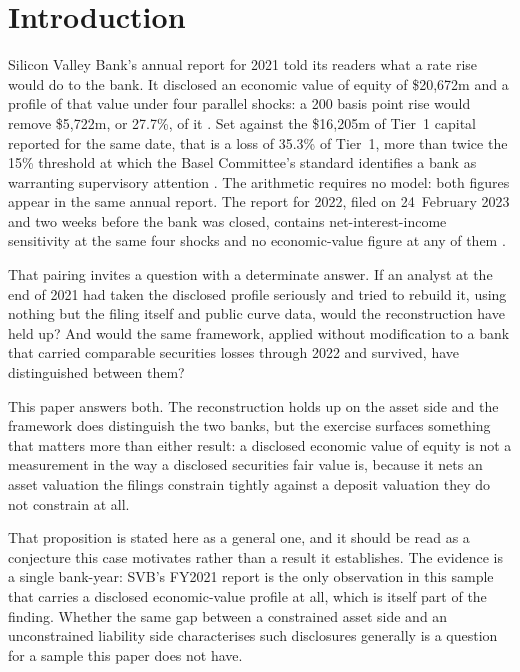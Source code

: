 \section{Introduction}
\label{sec:introduction}

Silicon Valley Bank's annual report for 2021 told its readers what a rate rise would
do to the bank. It disclosed an economic value of equity of \$20,672m and a profile
of that value under four parallel shocks: a 200 basis point rise would remove
\$5,722m, or 27.7\%, of it \citep{SVB10K2021}. Set against the \$16,205m of Tier~1
capital reported for the same date, that is a loss of 35.3\% of Tier~1, more than
twice the 15\% threshold at which the Basel Committee's standard identifies a bank as
warranting supervisory attention \citep{BCBS2016}. The arithmetic requires no model:
both figures appear in the same annual report. The report for 2022, filed on
24~February 2023 and two weeks before
the bank was closed, contains net-interest-income sensitivity at the same four shocks
and no economic-value figure at any of them \citep{SVB10K2022}.

That pairing invites a question with a determinate answer. If an analyst at the end of
2021 had taken the disclosed profile seriously and tried to rebuild it, using
nothing but the filing itself and public curve data, would the reconstruction have
held up? And would the same framework, applied without modification to a bank that
carried comparable securities losses through 2022 and survived, have distinguished
between them?

This paper answers both. The reconstruction holds up on the asset side and the
framework does distinguish the two banks, but the exercise surfaces something that
matters more than either result: a disclosed economic value of equity is not a
measurement in the way a disclosed securities fair value is, because it nets an asset
valuation the filings constrain tightly against a deposit valuation they do not
constrain at all.

That proposition is stated here as a general one, and it should be read as a
conjecture this case motivates rather than a result it establishes. The evidence is a
single bank-year: SVB's FY2021 report is the only observation in this sample that
carries a disclosed economic-value profile at all, which is itself part of the
finding. Whether the same gap between a constrained asset side and an unconstrained
liability side characterises such disclosures generally is a question for a sample
this paper does not have.

